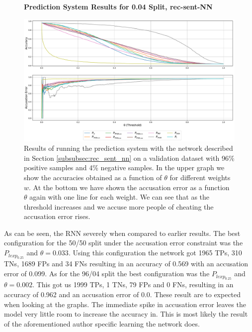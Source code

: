 \begin{figure}
    \centering
    \textbf{Prediction System Results for 0.04 Split, \glsdesc{rec-sent-NN}}\par\medskip
    \includegraphics[scale=0.33]{./pictures/experiments/rec_sent_nn/prediction_system_04}
    \caption{Results of running the prediction system with the network described
        in Section \ref{subsubsec:rec_sent_nn} on a validation dataset
        with 96\% positive samples and 4\% negative samples. In the upper graph
        we show the accuracies obtained as a function of $\theta$ for different
        weights $w$. At the bottom we have shown the accusation error as a
        function $\theta$ again with one line for each weight. We can see that
        as the threshold increases and we accuse more people of cheating the
        accusation error rises.}
    \label{fig:rec-sent-NN-pred-4}
\end{figure}

As can be seen, the \gls{RNN} severely when compared to earlier results. The
best configuration for the 50/50 split under the accusation error constraint was
the $P_{lexp_{0.25}}$ and $\theta = 0.033$. Using this configuration the network
got 1965 \glspl{TP}, 310 \glspl{TN}, 1689 \glspl{FP} and 34 \glspl{FN} resulting
in an accuracy of 0.569 with an accusation error of 0.099. As for the 96/04
split the best configuration was the $P_{lexp_{0.25}}$ and $\theta = 0.002$.
This got us 1999 \glspl{TP}, 1 \glspl{TN}, 79 \glspl{FP} and 0 \glspl{FN},
resulting in an accuracy of 0.962 and an accusation error of 0.0. These result
are to expected when looking at the graphs. The immediate spike in accusation
error leaves the model very little room to increase the accuracy in. This is
most likely the result of the aforementioned author specific learning the
network does.


